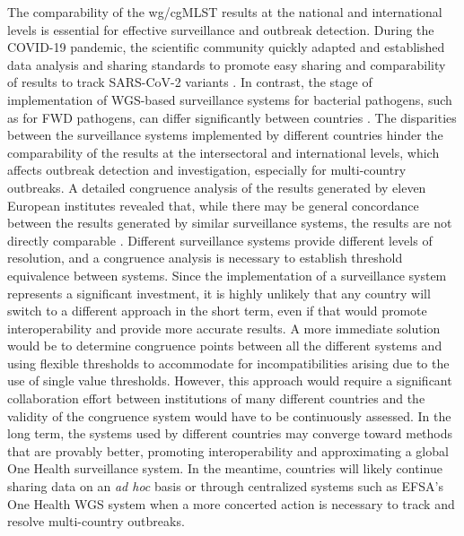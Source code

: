 The comparability of the \ac{wg/cgMLST} results at the national and international levels is essential for effective surveillance and outbreak detection. During the COVID-19 pandemic, the scientific community quickly adapted and established data analysis and sharing standards to promote easy sharing and comparability of results to track SARS-CoV-2 variants \cite{maxwell_fair_2023, griffiths_future-proofing_2022}. In contrast, the stage of implementation of \ac{WGS}-based surveillance systems for bacterial pathogens, such as for \ac{FWD} pathogens, can differ significantly between countries \cite{mixao_multi-country_2025}. The disparities between the surveillance systems implemented by different countries hinder the comparability of the results at the intersectoral and international levels, which affects outbreak detection and investigation, especially for multi-country outbreaks. A detailed congruence analysis of the results generated by eleven European institutes revealed that, while there may be general concordance between the results generated by similar surveillance systems, the results are not directly comparable \cite{mixao_multi-country_2025}. Different surveillance systems provide different levels of resolution, and a congruence analysis is necessary to establish threshold equivalence between systems. Since the implementation of a surveillance system represents a significant investment, it is highly unlikely that any country will switch to a different approach in the short term, even if that would promote interoperability and provide more accurate results. A more immediate solution would be to determine congruence points between all the different systems and using flexible thresholds to accommodate for incompatibilities arising due to the use of single value thresholds. However, this approach would require a significant collaboration effort between institutions of many different countries and the validity of the congruence system would have to be continuously assessed. In the long term, the systems used by different countries may converge toward methods that are provably better, promoting interoperability and approximating a global One Health surveillance system. In the meantime, countries will likely continue sharing data on an \textit{ad hoc} basis or through centralized systems such as \ac{EFSA}'s One Health WGS system when a more concerted action is necessary to track and resolve multi-country outbreaks.

